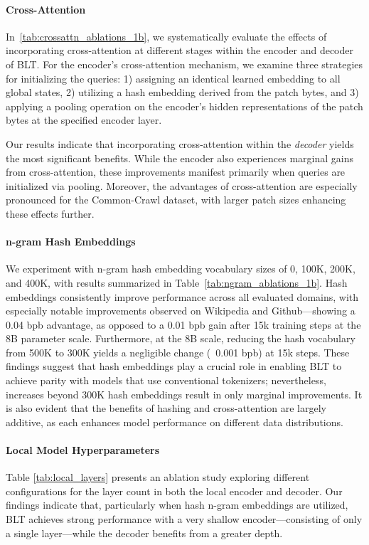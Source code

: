 \paragraph{Cross-Attention} 
In~\autoref{tab:crossattn_ablations_1b}, we systematically evaluate the effects of incorporating cross-attention at different stages within the encoder and decoder of {\textsc BLT}. For the encoder's cross-attention mechanism, we examine three strategies for initializing the queries: 1) assigning an identical learned embedding to all global states, 2) utilizing a hash embedding derived from the patch bytes, and 3) applying a pooling operation on the encoder's hidden representations of the patch bytes at the specified encoder layer.

Our results indicate that incorporating cross-attention within the \textit{decoder} yields the most significant benefits. While the encoder also experiences marginal gains from cross-attention, these improvements manifest primarily when queries are initialized via pooling. Moreover, the advantages of cross-attention are especially pronounced for the Common-Crawl dataset, with larger patch sizes enhancing these effects further.

\paragraph{n-gram Hash Embeddings} 

We experiment with n-gram hash embedding vocabulary sizes of 0, 100K, 200K, and 400K, with results summarized in Table~\ref{tab:ngram_ablations_1b}. Hash embeddings consistently improve performance across all evaluated domains, with especially notable improvements observed on Wikipedia and Github—showing a 0.04 bpb advantage, as opposed to a 0.01 bpb gain after 15k training steps at the 8B parameter scale. Furthermore, at the 8B scale, reducing the hash vocabulary from 500K to 300K yields a negligible change (~0.001 bpb) at 15k steps. These findings suggest that hash embeddings play a crucial role in enabling {\textsc BLT} to achieve parity with models that use conventional tokenizers; nevertheless, increases beyond 300K hash embeddings result in only marginal improvements. It is also evident that the benefits of hashing and cross-attention are largely additive, as each enhances model performance on different data distributions.

\paragraph{Local Model Hyperparameters} Table \ref{tab:local_layers} presents an ablation study exploring different configurations for the layer count in both the local encoder and decoder. Our findings indicate that, particularly when hash n-gram embeddings are utilized, {\textsc BLT} achieves strong performance with a very shallow encoder—consisting of only a single layer—while the decoder benefits from a greater depth.

